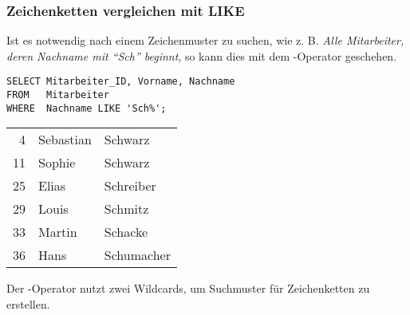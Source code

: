         \subsubsection{Zeichenketten vergleichen mit LIKE}
          Ist es notwendig nach einem Zeichenmuster zu suchen, wie z. B. \textit{Alle Mitarbeiter, deren Nachname mit \enquote{Sch} beginnt}, so kann dies mit dem -Operator geschehen.
          \begin{lstlisting}[language=oracle_sql,caption={Zeichenkettensuche mit einem Suchmuster},label=sql02_08]
SELECT Mitarbeiter_ID, Vorname, Nachname
FROM   Mitarbeiter
WHERE  Nachname LIKE 'Sch%';
          \end{lstlisting}
          \begin{center}
            \begin{small}
              \tablehead{}
              \tabletail{
              }
              \begin{msoraclesql}
                \begin{supertabular}{rll}
                  4 & Sebastian & Schwarz \\
                  11 & Sophie & Schwarz \\
                  25 & Elias & Schreiber \\
                  29 & Louis & Schmitz \\
                  33 & Martin & Schacke \\
                  36 & Hans & Schumacher \\
                \end{supertabular}
              \end{msoraclesql}
            \end{small}
          \end{center}
          Der -Operator nutzt zwei Wildcards, um Suchmuster f\"ur Zeichenketten zu erstellen.
